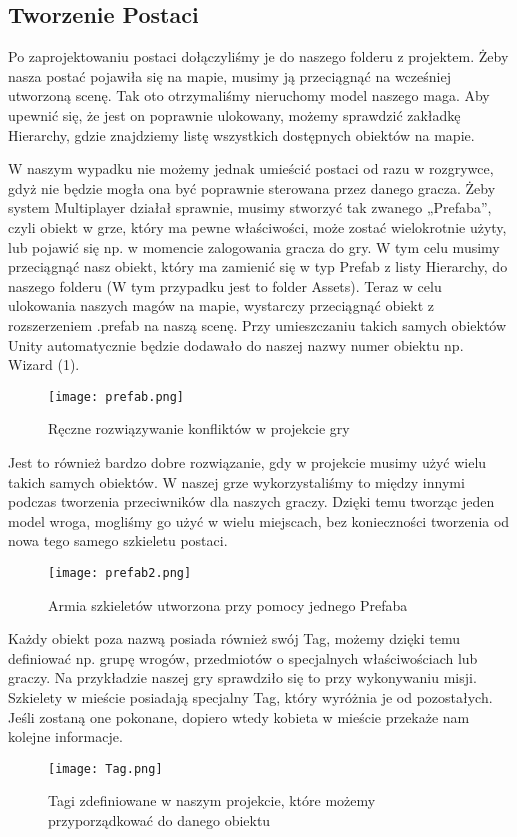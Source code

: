 \subsection{Tworzenie Postaci}
Po zaprojektowaniu postaci dołączyliśmy je do naszego folderu z projektem. Żeby nasza postać pojawiła się na mapie, musimy ją przeciągnąć na wcześniej utworzoną scenę. Tak oto otrzymaliśmy nieruchomy model naszego maga. Aby upewnić się, że jest on poprawnie ulokowany, możemy sprawdzić zakładkę Hierarchy, gdzie znajdziemy listę wszystkich dostępnych obiektów na mapie. 

W naszym wypadku nie możemy jednak umieścić postaci od razu w rozgrywce, gdyż nie będzie mogła ona być poprawnie sterowana przez danego gracza. Żeby system Multiplayer działał sprawnie, musimy stworzyć tak zwanego „Prefaba”, czyli obiekt w grze, który ma pewne właściwości, może zostać wielokrotnie użyty, lub pojawić się np. w momencie zalogowania gracza do gry. W tym celu musimy przeciągnąć nasz obiekt, który ma zamienić się w typ Prefab z listy Hierarchy, do naszego folderu (W tym przypadku jest to folder Assets). Teraz w celu ulokowania naszych magów na mapie, wystarczy przeciągnąć obiekt z rozszerzeniem .prefab na naszą scenę. Przy umieszczaniu takich samych obiektów Unity automatycznie będzie dodawało do naszej nazwy numer obiektu np. Wizard (1). 
\begin{figure}[H]
	\center
	\texttt{[image: prefab.png]}
	\caption{Ręczne rozwiązywanie konfliktów w projekcie gry}
\end{figure}
Jest to również bardzo dobre rozwiązanie, gdy w projekcie musimy użyć wielu takich samych obiektów. W naszej grze wykorzystaliśmy to między innymi podczas tworzenia przeciwników dla naszych graczy. Dzięki temu tworząc jeden model wroga, mogliśmy go użyć w wielu miejscach, bez konieczności tworzenia od nowa tego samego szkieletu postaci.
\begin{figure}[H]
	\center
	\texttt{[image: prefab2.png]}
	\caption{Armia szkieletów utworzona przy pomocy jednego Prefaba}
\end{figure}

Każdy obiekt poza nazwą posiada również swój Tag, możemy dzięki temu definiować np. grupę wrogów, przedmiotów o specjalnych właściwościach lub graczy. Na przykładzie naszej gry sprawdziło się to przy wykonywaniu misji. Szkielety w mieście posiadają specjalny Tag, który wyróżnia je od pozostałych. Jeśli zostaną one pokonane, dopiero wtedy kobieta w mieście przekaże nam kolejne informacje.
\begin{figure}[H]
	\center
	\texttt{[image: Tag.png]}
	\caption{Tagi zdefiniowane w naszym projekcie, które możemy przyporządkować do danego obiektu}
\end{figure}


